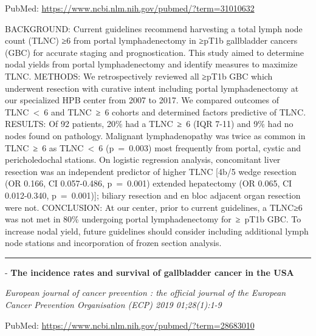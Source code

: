 \documentclass[]{article}
\begin{document}
PubMed: \url{https://www.ncbi.nlm.nih.gov/pubmed/?term=31010632}

BACKGROUND: Current guidelines recommend harvesting a total lymph node
count (TLNC) ≥6 from portal lymphadenectomy in ≥pT1b gallbladder cancers
(GBC) for accurate staging and prognostication. This study aimed to
determine nodal yields from portal lymphadenectomy and identify measures
to maximize TLNC. METHODS: We retrospectively reviewed all ≥pT1b GBC
which underwent resection with curative intent including portal
lymphadenectomy at our specialized HPB center from 2007 to 2017. We
compared outcomes of TLNC~\textless{}~6 and TLNC~≥~6 cohorts and
determined factors predictive of TLNC. RESULTS: Of 92 patients, 20\% had
a TLNC~≥~6 (IQR 7-11) and 9\% had no nodes found on pathology. Malignant
lymphadenopathy was twice as common in TLNC~≥~6 as TLNC~\textless{}~6
(p~=~0.003) most frequently from portal, cystic and pericholedochal
stations. On logistic regression analysis, concomitant liver resection
was an independent predictor of higher TLNC {[}4b/5 wedge resection (OR
0.166, CI 0.057-0.486, p~=~0.001) extended hepatectomy (OR 0.065, CI
0.012-0.340, p~=~0.001){]}; biliary resection and en bloc adjacent organ
resection were not. CONCLUSION: At our center, prior to current
guidelines, a TLNC≥6 was not met in 80\% undergoing portal
lymphadenectomy for~≥~pT1b GBC. To increase nodal yield, future
guidelines should consider including additional lymph node stations and
incorporation of frozen section analysis.

{}

{}

\begin{center}\rule{0.5\linewidth}{\linethickness}\end{center}

 - \textbf{The incidence rates and survival of gallbladder cancer in the
USA}

\emph{European journal of cancer prevention : the official journal of
the European Cancer Prevention Organisation (ECP) 2019 01;28(1):1-9}

PubMed: \url{https://www.ncbi.nlm.nih.gov/pubmed/?term=28683010}
\end{document}
